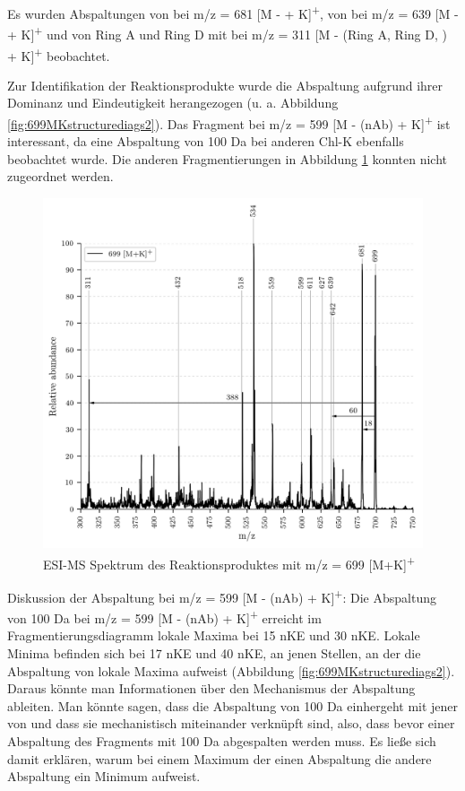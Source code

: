Es wurden Abspaltungen von  bei m/z = 681 [M -  + K]\textsuperscript{+}, von  bei m/z = 639 [M -  + K]\textsuperscript{+} und von Ring A und Ring D mit  bei m/z = 311 [M - (Ring A, Ring D, ) + K]\textsuperscript{+} beobachtet. 

Zur Identifikation der Reaktionsprodukte wurde die  Abspaltung aufgrund ihrer Dominanz und Eindeutigkeit herangezogen (u. a.
 Abbildung \ref{fig:699MKstructurediags2}). Das Fragment bei m/z = 599 [M - (\gls{nAb}) + K]\textsuperscript{+} ist interessant, da eine Abspaltung von 100 Da bei anderen \gls{Chl-K} ebenfalls beobachtet wurde. Die anderen Fragmentierungen in Abbildung \ref{fig:699MKLeafspray} konnten nicht zugeordnet werden. \\

\begin{figure}[!htbp]
  \centering
  \includegraphics[width=\textwidth, height=0.6\textwidth]{figures/Kapitel4/Kataboliten/VWA_MS_LeafSpray_699.png}
  \caption[ESI-MS Spektrum des Reaktionsproduktes von Bo-DNCC, Quelle: Autor]{ESI-MS Spektrum des Reaktionsproduktes mit m/z = 699 [M+K]\textsuperscript{+}}
  \label{fig:699MKLeafspray}
\end{figure}

Diskussion der Abspaltung bei m/z = 599 [M - (\gls{nAb}) + K]\textsuperscript{+}: Die Abspaltung von 100 Da bei m/z = 599 [M - (\gls{nAb}) + K]\textsuperscript{+} erreicht im Fragmentierungsdiagramm lokale Maxima bei 15 \gls{nKE} und 30 \gls{nKE}. Lokale Minima befinden sich bei 17 \gls{nKE} und 40 \gls{nKE}, an jenen Stellen, an der die Abspaltung von  lokale Maxima aufweist (Abbildung \ref{fig:699MKstructurediags2}). Daraus könnte man Informationen über den Mechanismus der Abspaltung ableiten. Man könnte sagen, dass die Abspaltung von 100 Da einhergeht mit jener von  und dass sie mechanistisch miteinander verknüpft sind, also, dass bevor einer Abspaltung des Fragments mit 100 Da  abgespalten werden muss. Es ließe sich damit erklären, warum bei einem Maximum der einen Abspaltung die andere Abspaltung ein Minimum aufweist.\\ 


